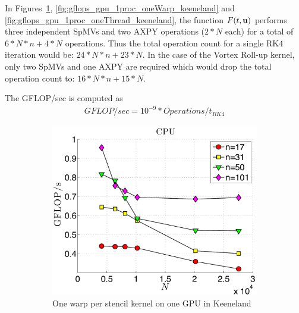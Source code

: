 In Figures~\ref{fig:gflops_cpu_1proc_keeneland}, \ref{fig:gflops_gpu_1proc_oneWarp_keeneland} and \ref{fig:gflops_gpu_1proc_oneThread_keeneland}, the function $F(t,\mathbf{u})$ performs three independent SpMVs and two AXPY operations ($2*N$ each) for a total of $6*N*n + 4*N$ operations. Thus the total operation count for a single RK4 iteration would be: $24*N*n +23*N$. 
In the case of the Vortex Roll-up kernel, only two SpMVs and one AXPY are required which would drop the total operation count to: $16*N*n + 15*N$. 

The GFLOP/sec is computed as 
\begin{align}
GFLOP/sec = 10^{-9} * Operations / t_{RK4}
\end{align}

\begin{figure}
\centering
\begin{subfigure}[t]{0.425\textwidth}
\includegraphics[width=\textwidth]{../figures/keeneland_results/alltoallv_cosine/gflops_cpu_1proc_oneWarpPerStencil.pdf}
\caption{One warp per stencil kernel on one GPU in Keeneland}
\label{fig:gflops_cpu_1proc_keeneland}
\end{subfigure} \\
\begin{subfigure}[t]{0.425\textwidth}

\end{subfigure}
\end{figure}
